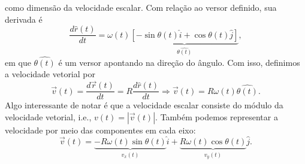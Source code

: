 \documentclass{article}
\begin{document}
    como dimens\~ao da velocidade escalar. Com rela\c c\~ao ao versor definido, sua derivada \'e 
      $$
      \frac{d\hat{r}(t)}{dt} = \omega(t)\underbrace{[-\sin{\theta(t)}\hat{i}+\cos{\theta(t)}\hat{j}]}_{\hat{\theta(t)}},
      $$
      em que $\hat{\theta(t)}$ \'e um versor apontando na dire\c c\~ao do \^angulo. Com isso, definimos a velocidade vetorial por 
        $$
        \vec{v}(t) = \frac{d \vec{r}(t)}{dt} = R \frac{d\hat{r}(t)}{dt} \Rightarrow \vec{v}(t) = R\omega(t)\hat{\theta(t)}.
        $$
      Algo interessante de notar \'e que a velocidade escalar consiste do m\'odulo da velocidade vetorial, i.e., $v(t) = |\vec{v}(t)|.$
      Tamb\'em podemos representar a velocidade por meio das componentes em cada eixo: 
        $$
        \vec{v}(t) = \underbrace{-R\omega(t)\sin{\theta(t)}}_{v_{x}(t)}\hat{i} + \underbrace{R\omega(t)\cos{\theta(t)}}_{v_{y}(t)}\hat{j}.
        $$
\end{document}
